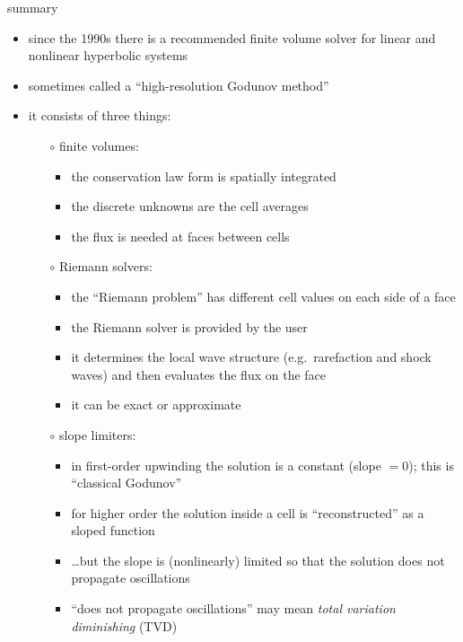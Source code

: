 \documentclass[10pt,hyperref]{beamer}
\begin{document}
\begin{frame}{summary}

\begin{itemize}
\item since the 1990s there is a recommended finite volume solver for linear and nonlinear hyperbolic systems
\item sometimes called a ``high-resolution Godunov method''
\item it consists of three things:
    \begin{itemize}
    \item[$\circ$] \alert{finite volumes}:
        \begin{itemize}
        \item the conservation law form is spatially integrated
        \item the discrete unknowns are the cell averages
        \item the flux is needed at faces between cells
        \end{itemize}
    \item[$\circ$] \alert{Riemann solvers}:
        \begin{itemize}
        \item the ``Riemann problem'' has different cell values on each side of a face
        \item the Riemann solver is provided by the user
        \item it determines the local wave structure (e.g.~rarefaction and shock waves) and then evaluates the flux on the face
        \item it can be exact or approximate
        \end{itemize}
    \item[$\circ$] \alert{slope limiters}:
        \begin{itemize}
        \item in first-order upwinding the solution is a constant (slope $= 0$); this is ``classical Godunov''
        \item for higher order the solution inside a cell is ``reconstructed'' as a sloped function
        \item \dots but the slope is (nonlinearly) limited so that the solution does not propagate oscillations
        \item ``does not propagate oscillations'' may mean \emph{total variation diminishing} (TVD)
        \end{itemize}
    \end{itemize}
\end{itemize}
\end{frame}
\end{document}

